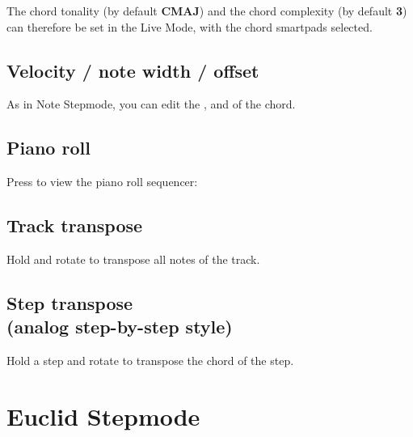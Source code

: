The chord tonality (by default \textbf{CMAJ}) and the chord complexity (by default \textbf{3}) can therefore be set in the Live Mode, with the chord smartpads selected.


\subsection{Velocity / note width / offset}
As in Note Stepmode, you can edit the ,  and  of the chord.

\subsection{Piano roll}

Press  to view the piano roll sequencer:



\subsection{Track transpose}

Hold  and rotate \encodericon{} to transpose all notes of the track.

\subsection[Step transpose]{Step transpose\\(analog step-by-step style)}

Hold a step \stepbystepicon{} and rotate \encodericon{} to transpose the chord of the step.


\section{Euclid Stepmode}

